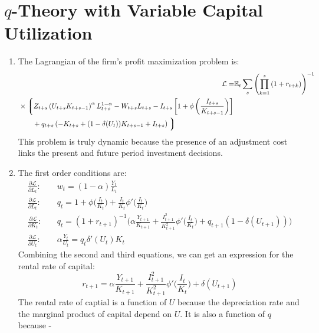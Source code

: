\documentclass[11pt]{amsart}
\begin{document}
\section{$q$-Theory with Variable Capital Utilization}
\begin{enumerate}[label = (\alph*)]
	\item The Lagrangian of the firm's profit maximization problem is: 
	\begin{align*}
	\mathcal{L} =& \mathbb{E}_t \sum_{s} \left( \prod_{k=1}^{s} \left(1 + r_{t+k} \right) \right)^{-1} \\
	\begin{split}
	&\times \left\lgroup  Z_{t+s} \left( U_{t+s} K_{t+s-1}  \right)^{\alpha} L_{t+s}^{1-\alpha}  - W_{t+s} L_{t+s} - I_{t+s} \left[ 1 + \phi \left( \frac{I_{t+s}}{K_{t+s-1}} \right) \right] \right. \\
	& \qquad + q_{t+s} \left( -K_{t+s} + (1-\delta(U_t))K_{t+s-1} + I_{t+s} \right) \left. \right\rgroup
	\end{split}
	\end{align*}
	This problem is truly dynamic because the presence of an adjustment cost links the present and future period investment decisions. 
	\item The first order conditions are: 
	\begin{align*}
		\frac{\partial \mathcal{L}}{\partial L_t}: &\quad  w_t = (1-\alpha) \frac{Y_t}{L_t} \\
		\frac{\partial \mathcal{L}}{\partial L_t}: & \quad q_t = 1 + \phi \bigg ( \frac{I_t}{K_t} \bigg ) + \frac{I_t}{K_t} \phi' \bigg ( \frac{I_t}{K_t} \bigg ) \\
		\frac{\partial \mathcal{L}}{\partial K_t}: & \quad q_t = (1+r_{t+1})^{-1} \bigg ( \alpha \frac{Y_{t+1}}{K_{t+1}} + \frac{I_{t+1}^2}{K_{t+1}^2} \phi' \bigg ( \frac{I_t}{K_t} \bigg ) + q_{t+1} (1-\delta(U_{t+1})) \bigg ) \\
		\frac{\partial \mathcal{L}}{\partial U_t}: &\quad  \alpha \frac{Y_t}{U_t} = q_t \delta'(U_t) K_t
	\end{align*}
	Combining the second and third equations, we can get an expression for the rental rate of capital: 
	\begin{equation*}
	r_{t+1} = \alpha \frac{Y_{t+1}}{K_{t+1}} + \frac{I_{t+1}^2}{K_{t+1}^2} \phi' \bigg ( \frac{I_t}{K_t} \bigg )  + \delta(U_{t+1})
	\end{equation*}
	The rental rate of captial is a function of $U$ because the depreciation rate and the marginal product of capital depend on $U$. It is also a function of $q$ because -
	

\end{enumerate}
\end{document}
